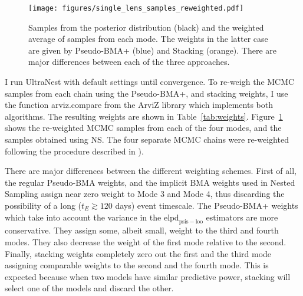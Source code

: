 \documentclass[12pt,dvipsnames]{report}
\newcommand{\ssf}[1]{\textsf{#1}}
\begin{document}
\begin{figure}[t]
    \begin{centering}
        \texttt{[image: figures/single\_lens\_samples\_reweighted.pdf]}
        \caption{
            Samples from the posterior distribution (black) and the weighted average 
            of samples from each mode. The weights in the latter case are given 
            by Pseudo-BMA+ (blue) and Stacking (orange). There are major differences 
            between each of the three approaches.
        }
            \label{fig:ogle_lightcurve_fit_samples_reweighted}
    \end{centering}
\end{figure}

I run \ssf{UltraNest} with default settings until convergence. 
To re-weigh the MCMC samples from each chain using the Pseudo-BMA+, and stacking 
weights, I use the function \ssf{arviz.compare} from the \ssf{ArviZ} library which 
implements both algorithms. The resulting weights are shown in Table~\ref{tab:weights}.
Figure~\ref{fig:ogle_lightcurve_fit_samples_reweighted} shows the re-weighted MCMC
samples from each of the four modes, and the samples obtained using NS. The four 
separate MCMC chains were re-weighted following the procedure described in 
\citet{arXiv:2006.12335}).

There are major differences between the different weighting schemes.
First of all, the regular Pseudo-BMA weights, and the implicit 
BMA weights used in Nested Sampling assign near zero weight to Mode 3 and Mode 4, 
thus discarding the possibility of a long ($t_E\gtrsim 120$ days) event 
timescale. The Pseudo-BMA+ weights which take into account 
the variance in the $\mathrm{elpd}_\mathrm{psis-loo}$ estimators are more conservative. 
They assign some, albeit small, weight to the third and fourth modes. They also 
decrease the weight of the first mode relative to the second.
Finally, stacking weights completely zero out the first and the third mode assigning 
comparable weights to the second and the fourth mode.
This is expected because when two models have similar predictive power, stacking 
will select one of the models and discard the other. 
\end{document}

